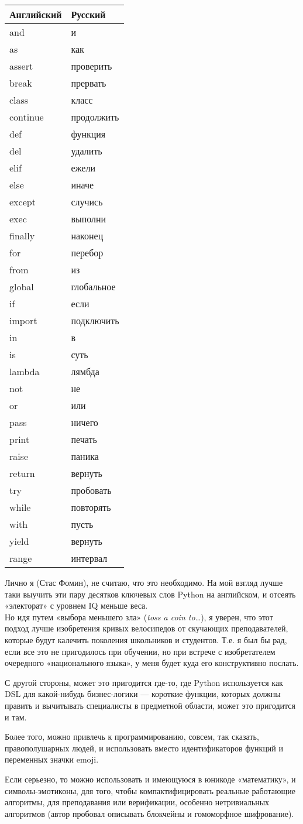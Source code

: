 ﻿\documentclass[a4paper,12pt]{article}
\begin{document}
\begin{longtable}[]{@{}ll@{}}
\toprule
Английский & Русский\tabularnewline
\midrule
\endhead
and & и\tabularnewline
as & как\tabularnewline
assert & проверить\tabularnewline
break & прервать\tabularnewline
class & класс\tabularnewline
continue & продолжить\tabularnewline
def & функция\tabularnewline
del & удалить\tabularnewline
elif & ежели\tabularnewline
else & иначе\tabularnewline
except & случись\tabularnewline
exec & выполни\tabularnewline
finally & наконец\tabularnewline
for & перебор\tabularnewline
from & из\tabularnewline
global & глобальное\tabularnewline
if & если\tabularnewline
import & подключить\tabularnewline
in & в\tabularnewline
is & суть\tabularnewline
lambda & лямбда\tabularnewline
not & не\tabularnewline
or & или\tabularnewline
pass & ничего\tabularnewline
print & печать\tabularnewline
raise & паника\tabularnewline
return & вернуть\tabularnewline
try & пробовать\tabularnewline
while & повторять\tabularnewline
with & пусть\tabularnewline
yield & вернуть\tabularnewline
range & интервал\tabularnewline
\bottomrule
\end{longtable}

Лично я (Стас Фомин), не считаю, что это необходимо. На мой взгляд лучше
таки выучить эти пару десятков ключевых слов Python на английском, и
отсеять «электорат» с уровнем IQ меньше веса.\\
Но идя путем «выбора меньшего зла» (\emph{toss a coin to\ldots{}}), я
уверен, что этот подход лучше изобретения кривых велосипедов  от
скучающих преподавателей, которые будут калечить поколения школьников
и студентов. Т.е. я был бы рад, если все это не
пригодилось при обучении, но при встрече с изобретателем очередного
«национального языка», у меня будет куда его конструктивно послать.

С другой стороны, может это пригодится где-то, где Python используется
как DSL для какой-нибудь бизнес-логики --- короткие функции, которых
должны править и вычитывать специалисты  в предметной области,
может это пригодится и там.

Более того, можно привлечь к программированию, совсем, так сказать,
правополушарных людей, и использовать вместо идентификаторов функций
и переменных значки emoji.

Если серьезно, то можно использовать и имеющуюся в юникоде «математику»,
и символы-эмотиконы, для того, чтобы компактифицировать 
реальные работающие алгоритмы, для преподавания или верификации,
особенно нетривиальных алгоритмов 
(автор пробовал описывать блокчейны и гомоморфное шифрование).
\end{document}
